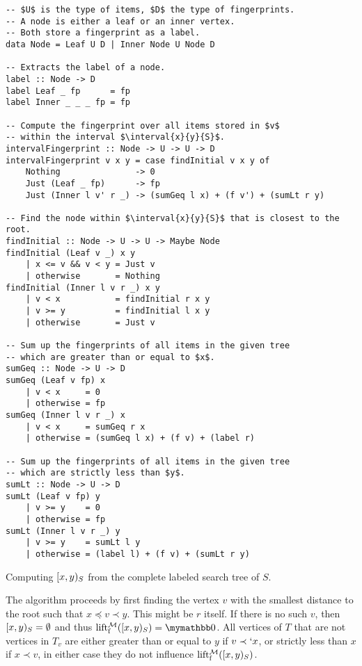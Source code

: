 \begin{listing}
\begin{verbatim}
-- $U$ is the type of items, $D$ the type of fingerprints.
-- A node is either a leaf or an inner vertex.
-- Both store a fingerprint as a label.
data Node = Leaf U D | Inner Node U Node D

-- Extracts the label of a node.
label :: Node -> D
label Leaf _ fp      = fp
label Inner _ _ _ fp = fp

-- Compute the fingerprint over all items stored in $v$
-- within the interval $\interval{x}{y}{S}$.
intervalFingerprint :: Node -> U -> U -> D
intervalFingerprint v x y = case findInitial v x y of
    Nothing               -> 0
    Just (Leaf _ fp)      -> fp
    Just (Inner l v' r _) -> (sumGeq l x) + (f v') + (sumLt r y)
                                           
-- Find the node within $\interval{x}{y}{S}$ that is closest to the root.
findInitial :: Node -> U -> U -> Maybe Node
findInitial (Leaf v _) x y
    | x <= v && v < y = Just v
    | otherwise       = Nothing
findInitial (Inner l v r _) x y
    | v < x           = findInitial r x y
    | v >= y          = findInitial l x y
    | otherwise       = Just v

-- Sum up the fingerprints of all items in the given tree
-- which are greater than or equal to $x$.
sumGeq :: Node -> U -> D
sumGeq (Leaf v fp) x
    | v < x     = 0
    | otherwise = fp
sumGeq (Inner l v r _) x
    | v < x     = sumGeq r x
    | otherwise = (sumGeq l x) + (f v) + (label r)

-- Sum up the fingerprints of all items in the given tree
-- which are strictly less than $y$.
sumLt :: Node -> U -> D
sumLt (Leaf v fp) y
    | v >= y    = 0
    | otherwise = fp
sumLt (Inner l v r _) y
    | v >= y    = sumLt l y
    | otherwise = (label l) + (f v) + (sumLt r y)
\end{verbatim}
\caption{Computing $\interval{x}{y}{S}$ from the complete labeled search tree of $S$.}
\label{listing:subset-fingerprint}
\end{listing}

The algorithm proceeds by first finding the vertex $v$ with the smallest distance to the root such that $x \preceq v \prec y$. This might be $r$ itself. If there is no such $v$, then $[{x},{y})_{S} = \emptyset$ and thus $\lift{\f}{\mathcal{M}}(\interval{x}{y}{S}) = \neutraladd$. All vertices of $T$ that are not vertices in $T_v$ are either greater than or equal to $y$ if $v \prec`x$, or strictly less than $x$ if $x \prec v$, in either case they do not influence $\operatorname{lift_{\operatorname{f}}^{\mathcal{M}}}([{x},{y})_{S})$.

